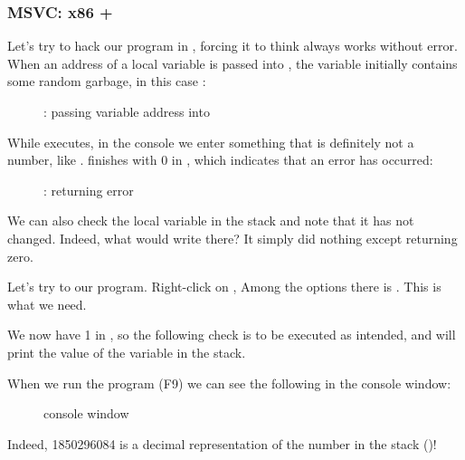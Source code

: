 \clearpage
\subsubsection{MSVC: x86 + \olly}

Let's try to hack our program in \olly, forcing it to think \scanf always works without error.
When an address of a local variable is passed into \scanf,
the variable initially contains some random garbage, in this case :

\begin{figure}[H]
\centering
{}
\caption{\olly: passing variable address into \scanf}
\label{fig:scanf_ex3_olly_1}
\end{figure}

\clearpage
While \scanf executes, in the console we enter something that is definitely not a number, like .
\scanf finishes with 0 in \EAX, which indicates that an error has occurred:

\begin{figure}[H]
\centering
{}
\caption{\olly: \scanf returning error}
\label{fig:scanf_ex3_olly_2}
\end{figure}

We can also check the local variable in the stack and note that it has not changed.
Indeed, what would \scanf write there?
It simply did nothing except returning zero.

Let's try to  our program.
Right-click on \EAX, 
Among the options there is .
This is what we need.

We now have 1 in \EAX, so the following check is to be executed as intended, 
and \printf will print the value of the variable in the stack.

When we run the program (F9) we can see the following in the console window:

\begin{figure}[H]
\centering
{}
\caption{console window}
\end{figure}

Indeed, 1850296084 is a decimal representation of the number in the stack ()!
